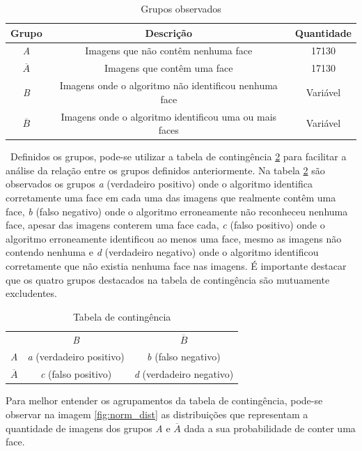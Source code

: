 \begin{table}[htbp]
    \caption{Grupos observados}
    \label{tab:grupos-images}
    \centering
    \begin{tabular}{ccc}\hline\hline
        \textbf{Grupo} & \textbf{Descrição} & \textbf{Quantidade} \\\hline
        \textit{A} & Imagens que não contêm nenhuma face & 17130 \\
        $\overline{A}$ & Imagens que contêm uma face & 17130 \\
        \textit{B} & Imagens onde o algoritmo não identificou nenhuma face & Variável \\
        $\overline{B}$ & Imagens onde o algoritmo identificou uma ou mais faces & Variável \\
    \hline\hline
    \end{tabular}
\end{table}
\
Definidos os grupos, pode-se utilizar a tabela de contingência \ref{tab:tabela_contingencia} para facilitar a análise da relação entre os grupos definidos anteriormente. Na tabela \ref{tab:tabela_contingencia} são observados os grupos \textit{a} (verdadeiro positivo) onde o algoritmo identifica corretamente uma face em cada uma das imagens que realmente contêm uma face, \textit{b} (falso negativo) onde o algoritmo erroneamente não reconheceu nenhuma face, apesar das imagens conterem uma face cada, \textit{c} (falso positivo) onde o algoritmo erroneamente identificou ao menos uma face, mesmo as imagens não contendo nenhuma e \textit{d} (verdadeiro negativo) onde o algoritmo identificou corretamente que não existia nenhuma face nas imagens. É importante destacar que os quatro grupos destacados na tabela de contingência são mutuamente excludentes. \cite{Dougherty:2012:PRC:2553126}

\begin{table}[htbp]
    \caption{Tabela de contingência}
    \label{tab:tabela_contingencia}
    \centering
    \begin{tabular}{ccc}\hline\hline
        & \textit{B} & $\overline{B}$ \\
    \textit{A} & \textit{a} (verdadeiro positivo) & \textit{b} (falso negativo) \\
    $\overline{A}$ & \textit{c} (falso positivo) & \textit{d} (verdadeiro negativo) \\
    \hline\hline
    \end{tabular}
\end{table}

Para melhor entender os agrupamentos da tabela de contingência, pode-se observar na imagem \ref{fig:norm_dist} as distribuições que representam a quantidade de imagens dos grupos \textit{A} e $\overline{A}$ dada a sua probabilidade de conter uma face. 

